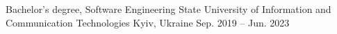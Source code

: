 

\begin{cventries}

  \cventry
    {Bachelor’s degree, Software Engineering} %
    {State University of Information and Communication Technologies} %
    {Kyiv, Ukraine} %
    {Sep. 2019 – Jun. 2023} %
    {
    }

\end{cventries}
